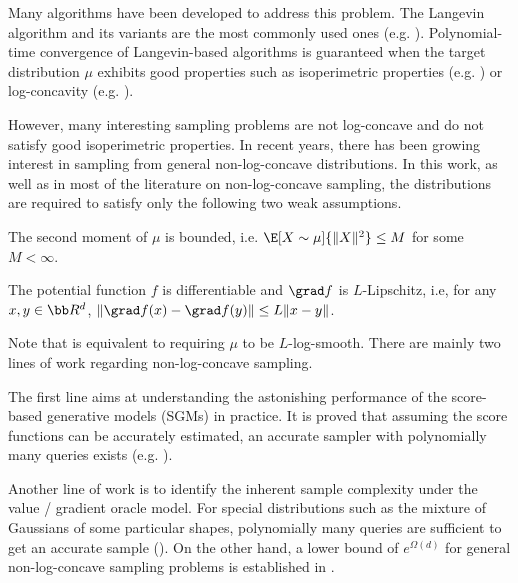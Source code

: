 \documentclass[11pt,a4paper]{article}
\begin{document}
Many algorithms have been developed to address this problem. The Langevin algorithm and its variants are the most commonly used ones (e.g. \cite{RT96,CB18,CCBJ18,Wib19,CLA+21,LPW24}). 
Polynomial-time convergence of Langevin-based algorithms is guaranteed when the target distribution $\mu$ exhibits good properties such as isoperimetric properties (e.g. \cite{VW19,CEL+24,MFH+23,ZCL+23}) or log-concavity (e.g. \cite{SL19,DCWY19,AC24}).

However, many interesting sampling problems are not log-concave and do not satisfy good isoperimetric properties. In recent years, there has been growing interest in sampling from general non-log-concave distributions. In this work, as well as in most of the literature on non-log-concave sampling, the distributions are required to satisfy only the following two weak assumptions.

\begin{assumption}\label{assump:moment}
    The second moment of $\mu$ is bounded, i.e. $\E[X\sim \mu]{\|X\|^2}\leq M$ for some $M<\infty$.
\end{assumption}

\begin{assumption}\label{assump:smooth}
    The potential function $f$ is differentiable and $\grad f$ is $L$-Lipschitz, i.e, for any $x,y\in \bb R^d$, $\|\grad f(x)-\grad f(y)\| \leq L \|x-y\|$.
\end{assumption}

Note that  is equivalent to requiring $\mu$ to be $L$-log-smooth. There are mainly two lines of work regarding non-log-concave sampling. 

The first line aims at understanding the astonishing performance of the  score-based generative models (SGMs) in practice. It is proved that assuming the score functions can be accurately estimated, an accurate sampler with polynomially many queries exists (e.g. \cite{CCL+23,CCL+23b,CLL23,BBDD24}). %

Another line of work is to identify the inherent sample complexity under the value / gradient oracle model. For special distributions such as the mixture of Gaussians of some particular shapes, polynomially many queries are sufficient to get an accurate sample (\cite{GLR18,GTC24}). On the other hand, a lower bound of $e^{\Omega(d)}$ for general non-log-concave sampling problems is established in \cite{GLR18}.
\end{document}
